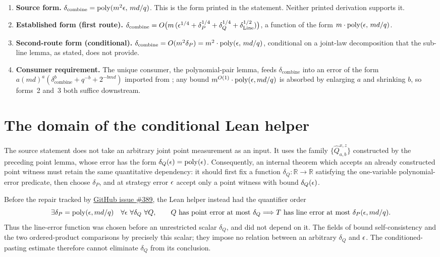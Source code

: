 \documentclass[11pt]{article}
\DeclareMathOperator{\poly}{poly}
\renewcommand{\ghissue}[1]{%
  \href{https://github.com/Dengnifer/MIPStarRE-QPBT/issues/#1}{GitHub issue \##1}}
\begin{document}
\begin{enumerate}
  \item \textbf{Source form.}
  $\delta_{\mathrm{combine}} = \poly(m^2\eps,\, md/q)$.  This is the form
  printed in the statement.  Neither printed derivation supports it.
  \item \textbf{Established form (first route).}
  $\delta_{\mathrm{combine}}
  = O\big(m\,(\epsilon^{1/4} + \delta_P^{1/4} + \delta_Q^{1/4}
  + \delta_{\mathrm{Line}}^{1/2})\big)$, a function of the form
  $m \cdot \poly(\eps,\, md/q)$.
  \item \textbf{Second-route form (conditional).}
  $\delta_{\mathrm{combine}} = O(m^2 \delta_P)
  = m^2 \cdot \poly(\eps,\, md/q)$, conditional on a joint-law
  decomposition that the sub-line lemma, as stated, does not provide.
  \item \textbf{Consumer requirement.}  The unique consumer, the
  polynomial-pair lemma, feeds $\delta_{\mathrm{combine}}$ into an error
  of the form
  $a(md)^a(\delta_{\mathrm{combine}}^b + q^{-b} + 2^{-bmd})$ imported
  from \cite{Ji2020LowIndividualDegree}; any bound
  $m^{O(1)} \cdot \poly(\eps, md/q)$ is absorbed by enlarging $a$ and
  shrinking $b$, so forms~2 and~3 both suffice downstream.
\end{enumerate}

\section{The domain of the conditional Lean helper}

The source statement does not take an arbitrary joint point measurement as an
input.  It uses the family $\{\hat Q^{x,z}_{a,b}\}$ constructed by the preceding
point lemma, whose error has the form $\delta_Q(\eps)=\poly(\eps)$.  Consequently,
an internal theorem which accepts an already constructed point witness must retain
the same quantitative dependency: it should first fix a function
$\delta_Q:\mathbb R\to\mathbb R$ satisfying the one-variable polynomial-error
predicate, then choose $\delta_P$, and at strategy error $\epsilon$ accept only a
point witness with bound $\delta_Q(\epsilon)$.

Before the repair tracked by \ghissue{389}, the Lean helper
 instead had the quantifier
order
\[
  \exists\delta_P=\poly(\eps,md/q)\quad
  \forall\eps\ \forall\delta_Q\ \forall Q,
  \qquad Q\text{ has point error at most }\delta_Q
  \Longrightarrow T\text{ has line error at most }\delta_P(\eps,md/q).
\]
Thus the line-error function was chosen before an unrestricted scalar
$\delta_Q$, and did not depend on it.  The fields of
 bound self-consistency and the two ordered-product
comparisons by precisely this scalar; they impose no relation between an
arbitrary $\delta_Q$ and $\epsilon$.  The conditioned-pasting estimate therefore
cannot eliminate $\delta_Q$ from its conclusion.
\end{document}
